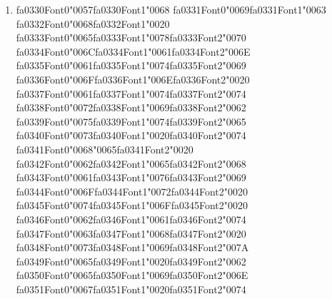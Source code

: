 \documentclass[12pt]{article}
\begin{document}
\begin{enumerate}[label=Q\arabic*.]
 \begin{enumerate}[label=(\Alph*)]
     \item Lower perplexity always indicates overfitting to training data
     \item Perplexity ignores normalization across token positions
     \item Question answering requires larger vocabularies than modeling
     \item Perplexity reflects intrinsic likelihood rather than task utility
 \end{enumerate}
 
 \item {\csname fa0330Font0\endcsname\char"0057}{\csname fa0330Font1\endcsname\char"0068} {\csname fa0331Font0\endcsname\char"0069}{\csname fa0331Font1\endcsname\char"0063} {\csname fa0332Font0\endcsname\char"0068}{\csname fa0332Font1\endcsname\char"0020} {\csname fa0333Font0\endcsname\char"0065}{\csname fa0333Font1\endcsname\char"0078}{\csname fa0333Font2\endcsname\char"0070} {\csname fa0334Font0\endcsname\char"006C}{\csname fa0334Font1\endcsname\char"0061}{\csname fa0334Font2\endcsname\char"006E} {\csname fa0335Font0\endcsname\char"0061}{\csname fa0335Font1\endcsname\char"0074}{\csname fa0335Font2\endcsname\char"0069} {\csname fa0336Font0\endcsname\char"006F}{\csname fa0336Font1\endcsname\char"006E}{\csname fa0336Font2\endcsname\char"0020} {\csname fa0337Font0\endcsname\char"0061}{\csname fa0337Font1\endcsname\char"0074}{\csname fa0337Font2\endcsname\char"0074} {\csname fa0338Font0\endcsname\char"0072}{\csname fa0338Font1\endcsname\char"0069}{\csname fa0338Font2\endcsname\char"0062} {\csname fa0339Font0\endcsname\char"0075}{\csname fa0339Font1\endcsname\char"0074}{\csname fa0339Font2\endcsname\char"0065} {\csname fa0340Font0\endcsname\char"0073}{\csname fa0340Font1\endcsname\char"0020}{\csname fa0340Font2\endcsname\char"0074} {\csname fa0341Font0\endcsname\char"0068}{\char"0065}{\csname fa0341Font2\endcsname\char"0020} {\csname fa0342Font0\endcsname\char"0062}{\csname fa0342Font1\endcsname\char"0065}{\csname fa0342Font2\endcsname\char"0068} {\csname fa0343Font0\endcsname\char"0061}{\csname fa0343Font1\endcsname\char"0076}{\csname fa0343Font2\endcsname\char"0069} {\csname fa0344Font0\endcsname\char"006F}{\csname fa0344Font1\endcsname\char"0072}{\csname fa0344Font2\endcsname\char"0020} {\csname fa0345Font0\endcsname\char"0074}{\csname fa0345Font1\endcsname\char"006F}{\csname fa0345Font2\endcsname\char"0020} {\csname fa0346Font0\endcsname\char"0062}{\csname fa0346Font1\endcsname\char"0061}{\csname fa0346Font2\endcsname\char"0074} {\csname fa0347Font0\endcsname\char"0063}{\csname fa0347Font1\endcsname\char"0068}{\csname fa0347Font2\endcsname\char"0020} {\csname fa0348Font0\endcsname\char"0073}{\csname fa0348Font1\endcsname\char"0069}{\csname fa0348Font2\endcsname\char"007A} {\csname fa0349Font0\endcsname\char"0065}{\csname fa0349Font1\endcsname\char"0020}{\csname fa0349Font2\endcsname\char"0062} {\csname fa0350Font0\endcsname\char"0065}{\csname fa0350Font1\endcsname\char"0069}{\csname fa0350Font2\endcsname\char"006E} {\csname fa0351Font0\endcsname\char"0067}{\csname fa0351Font1\endcsname\char"0020}{\csname fa0351Font2\endcsname\char"0074} 
\end{enumerate}
\end{document}

